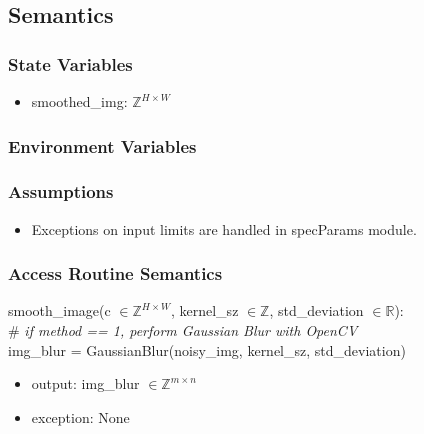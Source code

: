 \documentclass[12pt, titlepage]{article}
\begin{document}
\subsection{Semantics}

\subsubsection{State Variables}
\begin{itemize}
  \item smoothed\_img: $\mathbb{Z}^{H \times W}$
\end{itemize}

\subsubsection{Environment Variables}


\subsubsection{Assumptions}
  \begin{itemize}
  \item Exceptions on input limits are handled in specParams module.
  \end{itemize}

\subsubsection{Access Routine Semantics}

\noindent smooth\_image(c $\in \mathbb{Z}^{H \times W}$, 
kernel\_sz $\in \mathbb{Z}$, std\_deviation $\in \mathbb{R}$):\\
\# \textit{if method == 1, perform Gaussian Blur with OpenCV }\\
img\_blur = GaussianBlur(noisy\_img, kernel\_sz, std\_deviation)\\
\begin{itemize}
\item output: img\_blur $\in \mathbb{Z}^{m \times n}$
\end{itemize}

\begin{itemize}
\item exception: None
\end{itemize}
\end{document}
